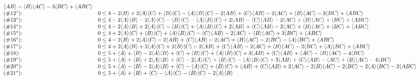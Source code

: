 {\begin{align*}
{\begin{array}{ll}
   \langle AB\rangle-\langle B\rangle \langle AC\rangle-3 \langle BC\rangle+\langle ABC\rangle \\
 \text{($\#$} 12^* \text{):  } & 0\leq 4-2 \langle B\rangle+2 \langle A\rangle \langle C\rangle+\langle B\rangle \langle C\rangle-\langle A\rangle \langle B\rangle \langle C\rangle-2
   \langle AB\rangle+\langle C\rangle \langle AB\rangle-2 \langle AC\rangle+\langle B\rangle \langle AC\rangle-3 \langle BC\rangle+\langle ABC\rangle \\
 \text{($\#$} 13^* \text{):  } & 0\leq 4-2 \langle A\rangle \langle B\rangle-2 \langle A\rangle \langle C\rangle-\langle B\rangle \langle C\rangle-\langle A\rangle \langle B\rangle
   \langle C\rangle+2 \langle AB\rangle-\langle C\rangle \langle AB\rangle-2 \langle AC\rangle+\langle B\rangle \langle AC\rangle+\langle BC\rangle+\langle ABC\rangle \\
 \text{($\#$} 14^* \text{):  } & 0\leq 4-2 \langle A\rangle \langle B\rangle+2 \langle A\rangle \langle C\rangle-\langle B\rangle \langle C\rangle+\langle A\rangle \langle B\rangle
   \langle C\rangle+2 \langle AB\rangle+\langle C\rangle \langle AB\rangle-2 \langle AC\rangle+\langle B\rangle \langle AC\rangle+\langle BC\rangle+\langle ABC\rangle \\
 \text{($\#$} 15^* \text{):  } & 0\leq 4+2 \langle A\rangle \langle C\rangle+\langle B\rangle \langle C\rangle+\langle A\rangle \langle B\rangle \langle C\rangle-\langle C\rangle \langle AB\rangle-2
   \langle AC\rangle-\langle B\rangle \langle AC\rangle+3 \langle BC\rangle+\langle ABC\rangle \\
 \text{($\#$} 16^* \text{):  } & 0\leq 4-2 \langle B\rangle+2 \langle A\rangle \langle C\rangle-2 \langle AB\rangle+\langle C\rangle \langle AB\rangle-2 \langle AC\rangle+\langle B\rangle
   \langle AC\rangle-2 \langle BC\rangle-\langle A\rangle \langle BC\rangle+\langle ABC\rangle \\
 \text{($\#$} 17^* \text{):  } & 0\leq 4+2 \langle A\rangle \langle B\rangle+2 \langle A\rangle \langle C\rangle+2 \langle B\rangle \langle C\rangle-2 \langle AB\rangle+\langle C\rangle
   \langle AB\rangle-2 \langle AC\rangle+\langle B\rangle \langle AC\rangle-2 \langle BC\rangle+\langle A\rangle \langle BC\rangle+\langle ABC\rangle \\
 \text{($\#$} 18 \text{):  } & 0\leq 5+\langle A\rangle+\langle B\rangle-2 \langle A\rangle \langle B\rangle+\langle C\rangle+\langle B\rangle \langle C\rangle+\langle A\rangle \langle B\rangle
   \langle C\rangle+3 \langle AB\rangle+\langle C\rangle \langle AB\rangle+\langle AC\rangle-\langle B\rangle \langle AC\rangle-4 \langle BC\rangle \\
 \text{($\#$} 19^* \text{):  } & 0\leq 5+\langle A\rangle+\langle B\rangle+2 \langle A\rangle \langle B\rangle+\langle C\rangle-2 \langle A\rangle \langle C\rangle+\langle B\rangle
   \langle C\rangle-\langle A\rangle \langle B\rangle \langle C\rangle+3 \langle AB\rangle+\langle C\rangle \langle AB\rangle-\langle AC\rangle+\langle B\rangle \langle AC\rangle-4 \langle BC\rangle \\
 \text{($\#$} 20^* \text{):  } & 0\leq 5+\langle A\rangle-\langle B\rangle-2 \langle A\rangle \langle B\rangle+\langle C\rangle-\langle A\rangle \langle C\rangle+\langle B\rangle
   \langle C\rangle+\langle AB\rangle+\langle C\rangle \langle AB\rangle+2 \langle AC\rangle-2 \langle B\rangle \langle AC\rangle-2 \langle BC\rangle-2 \langle A\rangle \langle BC\rangle-2 \langle ABC\rangle \\
 \text{($\#$} 21^* \text{):  } & 0\leq 5+\langle A\rangle+\langle B\rangle+\langle C\rangle-\langle A\rangle \langle C\rangle-\langle B\rangle \langle C\rangle-2 \langle A\rangle \langle B\rangle

\end{array}}
\end{align*}}
